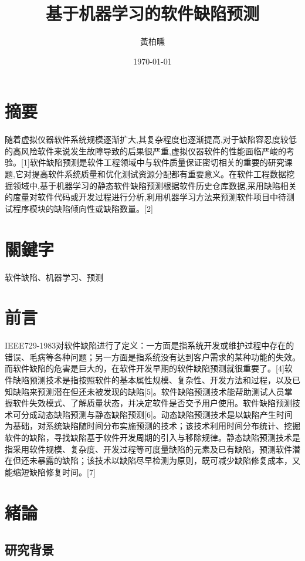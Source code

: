 \documentclass[12pt, a4paper]{article}
\author{黃柏曛}
\date{\today}
\title{基于机器学习的软件缺陷预测}
\begin{document}
\maketitle

\section{摘要}

随着虚拟仪器软件系统规模逐渐扩大,其复杂程度也逐渐提高,对于缺陷容忍度较低的高风险软件来说发生故障导致的后果很严重,虚拟仪器软件的性能面临严峻的考验。[1]软件缺陷预测是软件工程领域中与软件质量保证密切相关的重要的研究课题,它对提高软件系统质量和优化测试资源分配都有重要意义。在软件工程数据挖掘领域中,基于机器学习的静态软件缺陷预测根据软件历史仓库数据,采用缺陷相关的度量对软件代码或开发过程进行分析,利用机器学习方法来预测软件项目中待测试程序模块的缺陷倾向性或缺陷数量。[2]

\section{關鍵字}

软件缺陷、机器学习、预测

\section{前言}

IEEE729-1983对软件缺陷进行了定义：一方面是指系统开发或维护过程中存在的错误、毛病等各种问题；另一方面是指系统没有达到客户需求的某种功能的失效。而软件缺陷的危害是巨大的，在软件开发早期的软件缺陷预测就很重要了。[4]软件缺陷预测技术是指按照软件的基本属性规模、复杂性、开发方法和过程，以及已知缺陷来预测潜在但还未被发现的缺陷[5]。软件缺陷预测技术能帮助测试人员掌握软件失效模式、了解质量状态，并决定软件是否交予用户使用。软件缺陷预测技术可分成动态缺陷预测与静态缺陷预测[6]。动态缺陷预测技术是以缺陷产生时间为基础，对系统缺陷随时间分布实施预测的技术；该技术利用时间分布统计、挖掘软件的缺陷，寻找缺陷基于软件开发周期的引入与移除规律。静态缺陷预测技术是指采用软件规模、复杂度、开发过程等可度量缺陷的元素及已有缺陷，预测软件潜在但还未暴露的缺陷；该技术以缺陷尽早检测为原则，既可减少缺陷修复成本，又能缩短缺陷修复时间。[7]

\section{緒論}

\subsection{研究背景}
\end{document}
